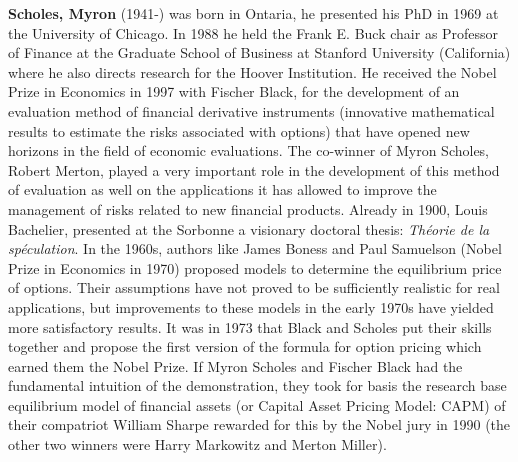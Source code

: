 \textbf{Scholes, Myron} (1941-) was born in Ontaria, he presented his PhD in 1969 at the University of Chicago. In 1988 he held the Frank E. Buck chair as Professor of Finance at the Graduate School of Business at Stanford University (California) where he also directs research for the Hoover Institution. He received the Nobel Prize in Economics in 1997 with Fischer Black, for the development of an evaluation method of financial derivative instruments (innovative mathematical results to estimate the risks associated with options) that have opened new horizons in the field of economic evaluations. The co-winner of Myron Scholes, Robert Merton, played a very important role in the development of this method of evaluation as well on the applications it has allowed to improve the management of risks related to new financial products. Already in 1900, Louis Bachelier, presented at the Sorbonne a visionary doctoral thesis: \textit{Théorie de la spéculation}. In the 1960s, authors like James Boness and Paul Samuelson (Nobel Prize in Economics in 1970) proposed models to determine the equilibrium price of options. Their assumptions have not proved to be sufficiently realistic for real applications, but improvements to these models in the early 1970s have yielded more satisfactory results. It was in 1973 that Black and Scholes put their skills together and propose the first version of the formula for option pricing which earned them the Nobel Prize. If Myron Scholes and Fischer Black had the fundamental intuition of the demonstration, they took for basis the research base equilibrium model of financial assets (or Capital Asset Pricing Model: CAPM) of their compatriot William Sharpe rewarded for this by the Nobel jury in 1990 (the other two winners were Harry Markowitz and Merton Miller).

